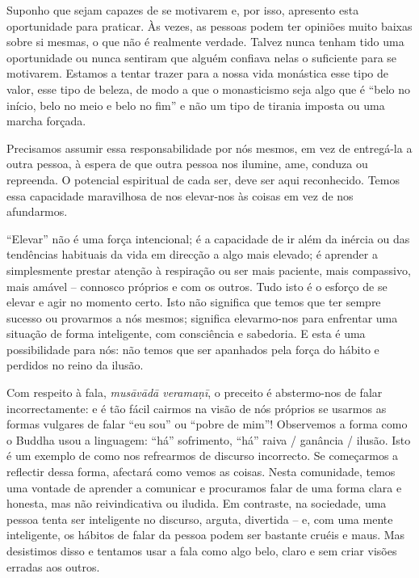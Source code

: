 Suponho que sejam capazes de se motivarem e, por isso, apresento esta
oportunidade para praticar. Às vezes, as pessoas podem ter opiniões muito baixas
sobre si mesmas, o que não é realmente verdade. Talvez nunca tenham tido uma
oportunidade ou nunca sentiram que alguém confiava nelas o suficiente para se
motivarem. Estamos a tentar trazer para a nossa vida monástica esse tipo de
valor, esse tipo de beleza, de modo a que o monasticismo seja algo que é ``belo
no início, belo no meio e belo no fim'' e não um tipo de tirania imposta ou uma
marcha forçada.

Precisamos assumir essa responsabilidade por nós mesmos, em vez de entregá-la a
outra pessoa, à espera de que outra pessoa nos ilumine, ame, conduza ou
repreenda. O potencial espiritual de cada ser, deve ser aqui reconhecido. Temos
essa capacidade maravilhosa de nos elevar-nos às coisas em vez de nos
afundarmos.

``Elevar'' não é uma força intencional; é a capacidade de ir além da inércia ou
das tendências habituais da vida em direcção a algo mais elevado; é aprender a
simplesmente prestar atenção à respiração ou ser mais paciente, mais compassivo,
mais amável -- connosco próprios e com os outros. Tudo isto é o esforço de se
elevar e agir no momento certo. Isto não significa que temos que ter sempre
sucesso ou provarmos a nós mesmos; significa elevarmo-nos para enfrentar uma
situação de forma inteligente, com consciência e sabedoria. E esta é uma
possibilidade para nós: não temos que ser apanhados pela força do hábito e
perdidos no reino da ilusão.

Com respeito à fala, \emph{musāvādā veramaṇī}, o preceito é abstermo-nos de
falar incorrectamente: e é tão fácil cairmos na visão de nós próprios se usarmos
as formas vulgares de falar ``eu sou'' ou ``pobre de mim''! Observemos a forma
como o Buddha usou a linguagem: ``há'' sofrimento, ``há'' raiva / ganância /
ilusão. Isto é um exemplo de como nos refrearmos de discurso incorrecto. Se
começarmos a reflectir dessa forma, afectará como vemos as coisas. Nesta
comunidade, temos uma vontade de aprender a comunicar e procuramos falar de uma
forma clara e honesta, mas não reivindicativa ou iludida. Em contraste, na
sociedade, uma pessoa tenta ser inteligente no discurso, arguta, divertida -- e,
com uma mente inteligente, os hábitos de falar da pessoa podem ser bastante
cruéis e maus. Mas desistimos disso e tentamos usar a fala como algo belo, claro
e sem criar visões erradas aos outros.

